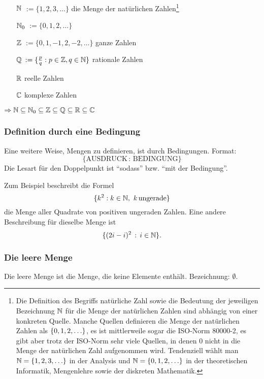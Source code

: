 \begin{itemize}
	\item[$ \mathbb N $] $ := \{ 1,2,3,\ldots \} $ die Menge der natürlichen Zahlen\footnote{Die Definition des Begriffs natürliche Zahl sowie die Bedeutung der jeweiligen Bezeichnung $\mathbb N$ für die Menge der natürlichen Zahlen sind abhängig von einer konkreten Quelle. Manche Quellen definieren die Menge der natürlichen Zahlen als $ \left\{ 0,1,2,\ldots \right\} $, es ist mittlerweile sogar die ISO-Norm 80000-2, es gibt aber trotz der ISO-Norm sehr viele Quellen, in denen $0$ nicht in die Menge der natürlichen Zahl aufgenommen wird. Tendenziell wählt man  $\mathbb N = \{1,2,3,\ldots \}$ in der Analysis und $\mathbb N = \{0,1,2,\ldots\}$ in der theoretischen Informatik, Mengenlehre sowie der diskreten Mathematik.}
	\item[$ \mathbb N_0 $] $ := \{ 0,1,2,\ldots \} $
	\item[$ \mathbb Z $] $ := \{ 0,1,-1,2,-2,\ldots \} $ ganze Zahlen
	\item[$ \mathbb Q $] $ := \{ \frac{p}{q} : p \in \mathbb Z, q \in \mathbb N \} $ rationale Zahlen
	\item[$ \mathbb R $] reelle Zahlen
	\item[$ \mathbb C $] komplexe Zahlen
\end{itemize}

\noindent $ \Rightarrow \mathbb N \subseteq \mathbb N_0 \subseteq \mathbb Z \subseteq \mathbb Q \subseteq \mathbb R \subseteq \mathbb C $


\subsubsection{Definition durch eine Bedingung}

Eine weitere Weise, Mengen zu definieren, ist durch Bedingungen. Format:
\[
			 \{ \text{AUSDRUCK} \,  : \, \text{BEDINGUNG} \}
\]
Die Lesart für den Doppelpunkt ist ``sodass''  bzw.  ``mit der Bedingung''.

Zum Beispiel beschreibt die Formel
 \[
 	\{ k^2 : k \in \mathbb N, \ k \, \text{ungerade} \} 
 \] die Menge aller Quadrate von positiven ungeraden Zahlen. Eine andere Beschreibung für dieselbe Menge ist 
 \[
 	\{  (2i -i)^2  \, :\, i \in \mathbb N\}.
 \] 



\subsubsection{Die leere Menge}

Die leere Menge ist die Menge, die keine Elemente enthält. Bezeichnung: $ \emptyset $.

